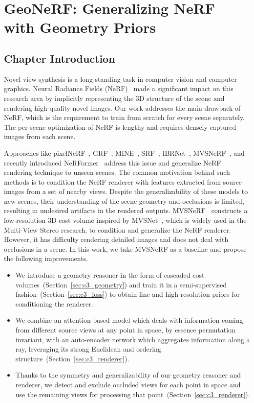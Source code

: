 \chapter{GeoNeRF: Generalizing NeRF with Geometry Priors}

\section{Chapter Introduction} \label{sec:chapter3}

Novel view synthesis is a long-standing task in computer vision and computer graphics. Neural Radiance Fields (NeRF)~\cite{mildenhall2020nerf} made a significant impact on this research area by implicitly representing the 3D structure of the scene and rendering high-quality novel images. Our work addresses the main drawback of NeRF, which is the requirement to train from scratch for every scene separately. The per-scene optimization of NeRF is lengthy and requires densely captured images from each scene.

Approaches like pixelNeRF~\cite{yu2021pixelnerf}, GRF~\cite{trevithick2021grf}, MINE~\cite{li2021mine}, SRF~\cite{chibane2021stereo}, IBRNet~\cite{wang2021ibrnet}, MVSNeRF~\cite{chen2021mvsnerf}, and recently introduced NeRFormer~\cite{reizenstein2021common} address this issue and generalize NeRF rendering technique to unseen scenes. The common motivation behind such methods is to condition the NeRF renderer with features extracted from source images from a set of nearby views. Despite the generalizability of these models to new scenes, their understanding of the scene geometry and occlusions is limited, resulting in undesired artifacts in the rendered outputs. MVSNeRF~\cite{chen2021mvsnerf} constructs a low-resolution 3D cost volume inspired by MVSNet~\cite{yao2018mvsnet}, which is widely used in the Multi-View Stereo research, to condition and generalize the NeRF renderer. However, it has difficulty rendering detailed images and does not deal with occlusions in a scene. In this work, we take MVSNeRF as a baseline and propose the following improvements.

\begin{itemize}
\item We introduce a geometry reasoner in the form of cascaded cost volumes~(Section~\ref{sec:c3_geometry}) and train it in a semi-supervised fashion~(Section~\ref{sec:c3_loss}) to obtain fine and high-resolution priors for conditioning the renderer.

\item We combine an attention-based model which deals with information coming from different source views at any point in space, by essence permutation invariant, with an auto-encoder network which aggregates information along a ray, leveraging its strong Euclidean and ordering structure~(Section~\ref{sec:c3_renderer}).

\item Thanks to the symmetry and generalizability of our geometry reasoner and renderer, we detect and exclude occluded views for each point in space and use the remaining views for processing that point~(Section~\ref{sec:c3_renderer}). 

\end{itemize}

